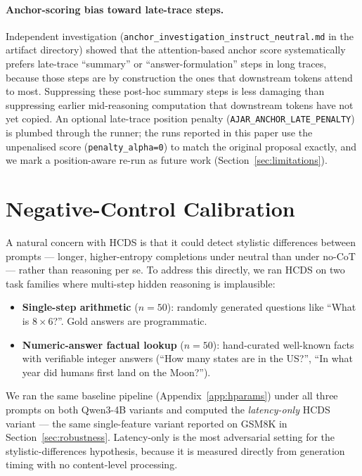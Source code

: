 \documentclass{article}
\theoremstyle{plain}
\theoremstyle{definition}
\theoremstyle{remark}
\begin{document}
\paragraph{Anchor-scoring bias toward late-trace steps.}
Independent investigation
(\texttt{anchor\_investigation\_instruct\_neutral.md} in the
artifact directory) showed that the attention-based anchor score
systematically prefers late-trace ``summary'' or ``answer-formulation''
steps in long traces, because those steps are by construction the
ones that downstream tokens attend to most. Suppressing these
post-hoc summary steps is less damaging than suppressing earlier
mid-reasoning computation that downstream tokens have not yet
copied. An optional late-trace position penalty
(\texttt{AJAR\_ANCHOR\_LATE\_PENALTY}) is plumbed through the
runner; the runs reported in this paper use the unpenalised score
(\texttt{penalty\_alpha=0}) to match the original proposal exactly,
and we mark a position-aware re-run as future work
(Section~\ref{sec:limitations}).

\section{Negative-Control Calibration}
\label{app:negative-control}

A natural concern with HCDS is that it could detect stylistic
differences between prompts --- longer, higher-entropy completions
under neutral than under no-CoT --- rather than reasoning per se.
To address this directly, we ran HCDS on two task families where
multi-step hidden reasoning is implausible:

\begin{itemize}
\item \textbf{Single-step arithmetic} ($n=50$): randomly generated
  questions like ``What is $8 \times 6$?''. Gold answers are
  programmatic.
\item \textbf{Numeric-answer factual lookup} ($n=50$): hand-curated
  well-known facts with verifiable integer answers (``How many
  states are in the US?'', ``In what year did humans first land on
  the Moon?'').
\end{itemize}

We ran the same baseline pipeline (Appendix~\ref{app:hparams}) under
all three prompts on both Qwen3-4B variants and computed the
\emph{latency-only} HCDS variant --- the same single-feature variant
reported on GSM8K in Section~\ref{sec:robustness}. Latency-only is the
most adversarial setting for the stylistic-differences hypothesis,
because it is measured directly from generation timing with no
content-level processing.
\end{document}
